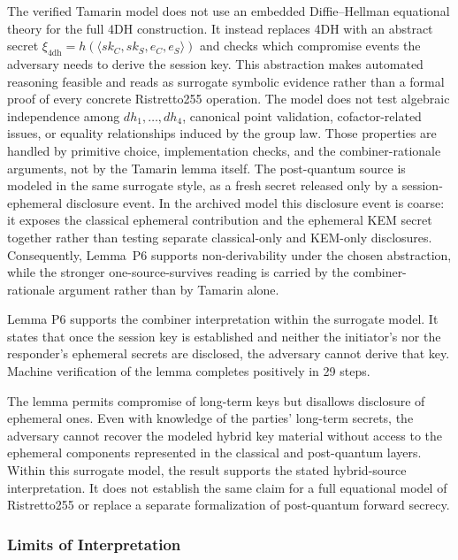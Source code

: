 \documentclass{ieeeijc}
\theoremstyle{remark}
\begin{document}
The verified Tamarin model does not use an embedded Diffie--Hellman equational theory for the full 4DH construction. It instead replaces 4DH with an abstract secret $\xi_{\mathrm{4dh}} = h(\langle sk_C,sk_S,e_C,e_S\rangle)$ and checks which compromise events the adversary needs to derive the session key. This abstraction makes automated reasoning feasible and reads as surrogate symbolic evidence rather than a formal proof of every concrete Ristretto255 operation. The model does not test algebraic independence among $dh_1,\ldots,dh_4$, canonical point validation, cofactor-related issues, or equality relationships induced by the group law. Those properties are handled by primitive choice, implementation checks, and the combiner-rationale arguments, not by the Tamarin lemma itself. The post-quantum source is modeled in the same surrogate style, as a fresh secret released only by a session-ephemeral disclosure event. In the archived model this disclosure event is coarse: it exposes the classical ephemeral contribution and the ephemeral KEM secret together rather than testing separate classical-only and KEM-only disclosures. Consequently, Lemma~P6 supports non-derivability under the chosen abstraction, while the stronger one-source-survives reading is carried by the combiner-rationale argument rather than by Tamarin alone.

Lemma P6 supports the combiner interpretation within the surrogate model. It states that once the session key is established and neither the initiator's nor the responder's ephemeral secrets are disclosed, the adversary cannot derive that key. Machine verification of the lemma completes positively in 29 steps.

The lemma permits compromise of long-term keys but disallows disclosure
of ephemeral ones. Even with knowledge of the parties' long-term
secrets, the adversary cannot recover the modeled hybrid key material
without access to the ephemeral components represented in the classical
and post-quantum layers. Within this surrogate model, the result
supports the stated hybrid-source interpretation. It does not establish
the same claim for a full equational model of Ristretto255 or replace a
separate formalization of post-quantum forward secrecy.

\subsubsection{Limits of Interpretation}
\end{document}
